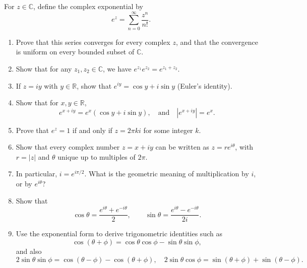 \documentclass{../note}
\begin{document}
\begin{exercise}{4}
For $z \in \mathbb{C}$, define the complex exponential by
\[
e^z = \sum_{n=0}^\infty \frac{z^n}{n!}.
\]

\begin{enumerate}[label=(\alph*)]
\item Prove that this series converges for every complex $z$, and that the convergence is uniform on every bounded subset of $\mathbb{C}$.
\item Show that for any $z_1, z_2 \in \mathbb{C}$, we have $e^{z_1} e^{z_2} = e^{z_1 + z_2}$.
\item If $z = iy$ with $y \in \mathbb{R}$, show that $e^{iy} = \cos y + i \sin y$ (Euler’s identity).
\item Show that for $x, y \in \mathbb{R}$,
\[
e^{x+iy} = e^x(\cos y + i \sin y), \quad \text{and} \quad |e^{x+iy}| = e^x.
\]
\item Prove that $e^z = 1$ if and only if $z = 2\pi k i$ for some integer $k$.
\item Show that every complex number $z = x + iy$ can be written as $z = r e^{i\theta}$, with $r = |z|$ and $\theta$ unique up to multiples of $2\pi$.
\item In particular, $i = e^{i\pi/2}$. What is the geometric meaning of multiplication by $i$, or by $e^{i\theta}$?
\item Show that
\[
\cos \theta = \frac{e^{i\theta} + e^{-i\theta}}{2}, \qquad
\sin \theta = \frac{e^{i\theta} - e^{-i\theta}}{2i}.
\]
\item Use the exponential form to derive trigonometric identities such as
\[
\cos(\theta + \phi) = \cos \theta \cos \phi - \sin \theta \sin \phi,
\]
and also
\[
2\sin \theta \sin \phi = \cos(\theta - \phi) - \cos(\theta + \phi), \quad
2\sin \theta \cos \phi = \sin(\theta + \phi) + \sin(\theta - \phi).
\]
\end{enumerate}
\end{exercise}
\end{document}
